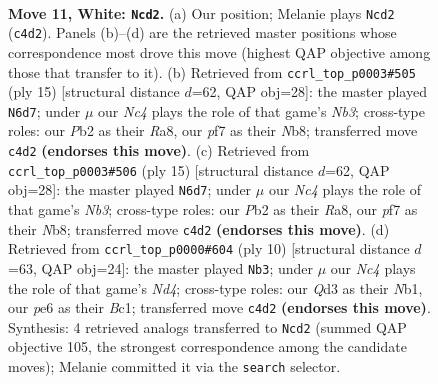 \documentclass[11pt]{article}
\begin{document}
\clearpage

\begin{figure}[p]\centering
\begin{subfigure}{0.46\textwidth}\centering
\resizebox{\linewidth}{!}{%
\newchessgame
\chessboard[
  setfen={rnbqr1k1/p1p1bppp/4p3/1p1n4/2NP4/3Q1BP1/PP2PP1P/RNB2RK1 w - - 0 11},
  showmover=false,
  pgfstyle=straightmove, color=movearrow, markmove={c4-d2}
]}
\caption{}
\end{subfigure}\hfill
\begin{subfigure}{0.46\textwidth}\centering
\resizebox{\linewidth}{!}{%
\newchessgame
\chessboard[
  setfen={rnbqk2r/pp2ppbp/1n1p2p1/P7/2PP4/2N5/1P3PPP/R1BQKBNR b KQkq - 0 8},
  showmover=false,
  pgfstyle=straightmove, color=movearrow, markmove={b6-d7}
]}
\caption{}
\end{subfigure}
\\[4pt]
\begin{subfigure}{0.46\textwidth}\centering
\resizebox{\linewidth}{!}{%
\newchessgame
\chessboard[
  setfen={rnbqk2r/pp2ppbp/1n1p2p1/P7/2PP4/2N5/1P3PPP/R1BQKBNR b KQkq - 0 8},
  showmover=false,
  pgfstyle=straightmove, color=movearrow, markmove={b6-d7}
]}
\caption{}
\end{subfigure}\hfill
\begin{subfigure}{0.46\textwidth}\centering
\resizebox{\linewidth}{!}{%
\newchessgame
\chessboard[
  setfen={rnbqkb1r/pp3ppp/3p1n2/4p3/3NP3/5P2/PPP3PP/RNBQKB1R w KQkq - 0 6},
  showmover=false,
  pgfstyle=straightmove, color=movearrow, markmove={d4-b3}
]}
\caption{}
\end{subfigure}
\caption{\textbf{Move 11, White: \texttt{Ncd2}.} (a) Our position; Melanie plays \texttt{Ncd2} (\texttt{c4d2}). Panels (b)--(d) are the retrieved master positions whose correspondence most drove this move (highest QAP objective among those that transfer to it). (b) Retrieved from \texttt{ccrl\_top\_p0003\#505} (ply 15) [structural distance $d$=62, QAP obj=28]: the master played \texttt{N6d7}; under $\mu$ our \emph{Nc4} plays the role of that game's \emph{Nb3}; cross-type roles: our \emph{P}b2 as their \emph{R}a8, our \emph{p}f7 as their \emph{N}b8; transferred move \texttt{c4d2} \textbf{(endorses this move)}. (c) Retrieved from \texttt{ccrl\_top\_p0003\#506} (ply 15) [structural distance $d$=62, QAP obj=28]: the master played \texttt{N6d7}; under $\mu$ our \emph{Nc4} plays the role of that game's \emph{Nb3}; cross-type roles: our \emph{P}b2 as their \emph{R}a8, our \emph{p}f7 as their \emph{N}b8; transferred move \texttt{c4d2} \textbf{(endorses this move)}. (d) Retrieved from \texttt{ccrl\_top\_p0000\#604} (ply 10) [structural distance $d$=63, QAP obj=24]: the master played \texttt{Nb3}; under $\mu$ our \emph{Nc4} plays the role of that game's \emph{Nd4}; cross-type roles: our \emph{Q}d3 as their \emph{N}b1, our \emph{p}e6 as their \emph{B}c1; transferred move \texttt{c4d2} \textbf{(endorses this move)}. Synthesis: 4 retrieved analogs transferred to \texttt{Ncd2} (summed QAP objective 105, the strongest correspondence among the candidate moves); Melanie committed it via the \texttt{search} selector.}
\label{fig:thought-m20}
\end{figure}
\end{document}
